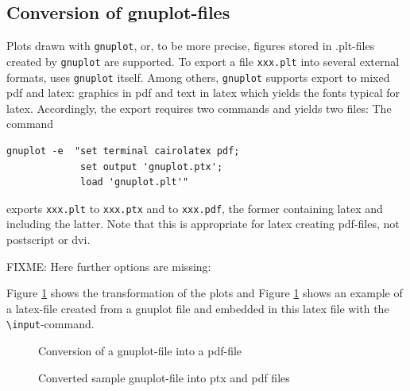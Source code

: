 \documentclass[12pt]{article}
\begin{document}
\subsection{Conversion of gnuplot-files}\label{subsec:gnuplot2pdf}

Plots drawn with {\tt gnuplot}, or, to be more precise, 
figures stored in .plt-files created by {\tt gnuplot} are supported. 
To export a file {\tt xxx.plt} into several external formats, 
uses {\tt gnuplot} itself. 
Among others, {\tt gnuplot} supports export to mixed pdf and latex: 
graphics in pdf and text in latex which yields the fonts typical for latex. 
Accordingly, the export requires two commands and yields two files: 
The command 
%
\begin{verbatim}
gnuplot -e  "set terminal cairolatex pdf;
             set output 'gnuplot.ptx';
             load 'gnuplot.plt'"
\end{verbatim}
%
exports {\tt xxx.plt} to {\tt xxx.ptx} and to {\tt xxx.pdf}, 
the former containing latex and including the latter. 
Note that this is appropriate for latex creating pdf-files, 
not postscript or \gls{dvi}. 

FIXME: 
Here further options are missing: 

Figure \ref{fig:plt2pdf} shows the transformation of the plots 
and Figure \ref{fig:plt2pdf} shows an example of a latex-file 
created from a gnuplot file 
and embedded in this latex file with the {\tt\textbackslash input}-command. 

\begin{figure}[htb]
\begin{center}

\end{center}
\caption{\label{fig:plt2pdf}Conversion of a gnuplot-file into a pdf-file}
\end{figure}

\begin{figure}[htb]
\begin{center}

\end{center}
\caption{\label{fig:gnuplot}
Converted sample gnuplot-file into ptx and pdf files }
\end{figure}
\end{document}

